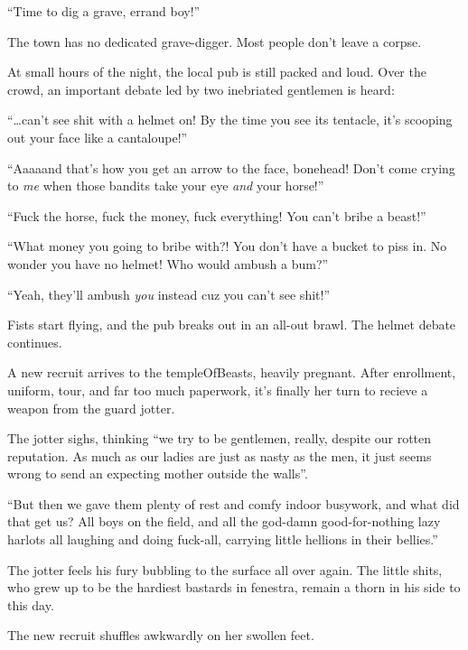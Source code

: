 \begin{multicols}{2}
\begin{exampletext}
  ``Time to dig a grave, errand boy!''

  The town has no dedicated grave-digger.
  Most people don't leave a corpse.
\end{exampletext}

\begin{exampletext}
  At small hours of the night, the local pub is still packed and loud.
  Over the crowd, an important debate led by two inebriated gentlemen is heard:

  ``\ldots can't
  see shit with a helmet on!
  By the time you see its tentacle, it's scooping out your face like a cantaloupe!''

  ``Aaaaand that's how you get an arrow to the face, bonehead!
  Don't come crying to \emph{me} when those bandits take your eye \emph{and} your horse!''

  ``Fuck the horse, fuck the money, fuck everything!
  You can't bribe a beast!''

  ``What money you going to bribe with?!
  You don't have a bucket to piss in.
  No wonder you have no helmet!
  Who would ambush a bum?''

  ``Yeah, they'll ambush \emph{you} instead cuz you can't see shit!''

  Fists start flying, and the pub breaks out in an all-out brawl.
  The helmet debate continues.
\end{exampletext}

\begin{exampletext}
  A new recruit arrives to the \gls{templeOfBeasts}, heavily pregnant.
  After enrollment, uniform, tour, and far too much paperwork, it's finally her turn to recieve a weapon from the \gls{guard} \gls{jotter}.

  The \gls{jotter} sighs, thinking ``we try to be gentlemen, really, despite our rotten reputation.
  As much as our ladies are just as nasty as the men, it just seems wrong to send an expecting mother outside the walls''.

  ``But then we gave them plenty of rest and comfy indoor busywork, and what did that get us?
  All boys on the field, and all the god-damn good-for-nothing lazy harlots all laughing and doing fuck-all, carrying little hellions in their bellies.''

  The \gls{jotter} feels his fury bubbling to the surface all over again.
  The little shits, who grew up to be the hardiest bastards in \gls{fenestra}, remain a thorn in his side to this day.

  The new recruit shuffles awkwardly on her swollen feet.


\end{exampletext}
\end{multicols}
